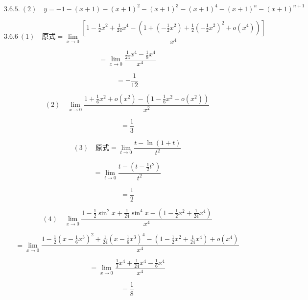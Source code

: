 \documentclass[UTF8,fontset=windows]{ctexart}
\begin{document}
\[
3.6.5.\ (2)\quad y=-1-(x+1)-(x+1)^{2}-(x+1)^{3}-(x+1)^{4}-(x+1)^{n}-(x+1)^{n+1}
\]

\[
3.6.6\ (1)\quad \text{原式}=\lim_{x\to0}\frac{\left[1-\frac{1}{2}x^{2}+\frac{1}{24}x^{4}-\left(1+\left(-\frac{1}{2}x^{2}\right)+\frac{1}{2}\left(-\frac{1}{2}x^{2}\right)^{2}+o(x^{4})\right)\right]}{x^{4}}
\]

\[
=\lim_{x\to0}\frac{\frac{1}{24}x^{4}-\frac{1}{8}x^{4}}{x^{4}}
\]

\[
=-\frac{1}{12}
\]

\[
(2)\quad \lim_{x\to0}\frac{1+\frac{1}{6}x^{2}+o(x^{2})-\left(1-\frac{1}{6}x^{2}+o(x^{2})\right)}{x^{2}}
\]

\[
=\frac{1}{3}
\]

\[
(3)\quad \text{原式}=\lim_{t\to0}\frac{t-\ln(1+t)}{t^{2}}
\]

\[
=\lim_{t\to0}\frac{t-\left(t-\frac{1}{2}t^{2}\right)}{t^{2}}
\]

\[
=\frac{1}{2}
\]

\[
(4)\quad \lim_{x\to0}\frac{1-\frac{1}{2}\sin^{2}x+\frac{1}{24}\sin^{4}x-\left(1-\frac{1}{2}x^{2}+\frac{1}{24}x^{4}\right)}{x^{4}}
\]

\[
=\lim_{x\to0}\frac{1-\frac{1}{2}\left(x-\frac{1}{6}x^{3}\right)^{2}+\frac{1}{24}\left(x-\frac{1}{6}x^{3}\right)^{4}-\left(1-\frac{1}{2}x^{2}+\frac{1}{24}x^{4}\right)+o(x^{4})}{x^{4}}
\]

\[
=\lim_{x\to0}\frac{\frac{1}{3}x^{4}+\frac{1}{24}x^{4}-\frac{1}{6}x^{4}}{x^{4}}
\]

\[
=\frac{1}{8}
\]
\end{document}
